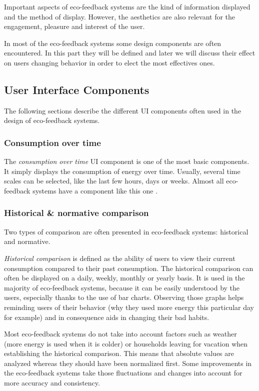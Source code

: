 \documentclass[journal]{vgtc}                %
\begin{document}
Important aspects of eco-feedback systems are the kind of information displayed and the method of display. However, the aesthetics are also relevant for the engagement, pleasure and interest of the user\cite{bartram2015design}.

In most of the eco-feedback systems some design components are often encountered.
In this part they will be defined and later we will discuss their effect on users changing behavior in order to elect the most effectives ones. 
\subsection{User Interface Components}
The following sections describe the different UI components often used in the design of eco-feedback systems.
\subsubsection{Consumption over time}
The \textit{consumption over time} UI component is one of the most basic components. It simply displays the consumption of energy over time. Usually, several time scales can be selected, like the last few hours, days or weeks.
Almost all eco-feedback systems have a component like this one \cite{spagnolli2011eco}.

\subsubsection{Historical \& normative comparison}
Two types of comparison are often presented in eco-feedback systems: historical and normative.

\textit{Historical comparison} is defined as the ability of users to view their current consumption compared to their past consumption. %
The historical comparison can often be displayed on a daily, weekly, monthly or yearly basis. It is used in the majority of eco-feedback systems, because it can be easily understood by the users, especially thanks to the use of bar charts. %
Observing those graphs helps reminding users of their behavior (why they used more energy this particular day for example) and in consequence aids in changing their bad habits.

Most eco-feedback systems do not take into account factors such as weather (more energy is used when it is colder) or households leaving for vacation when establishing the historical comparison\cite{karjalainen2011consumer}. This means that absolute values are analyzed whereas they should have been normalized first. Some improvements in the eco-feedback systems take those fluctuations and changes into account for more accuracy and consistency. \\
\end{document}
